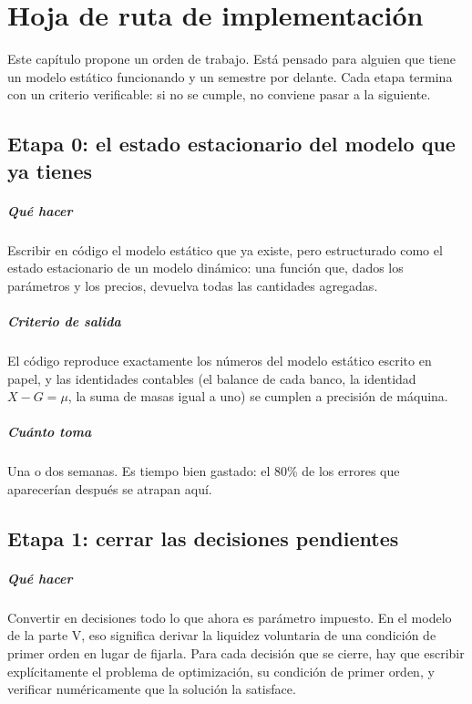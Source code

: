 \chapter{Hoja de ruta de implementación}
\label{cap:hoja-ruta}

Este capítulo propone un orden de trabajo. Está pensado para alguien que tiene un
modelo estático funcionando y un semestre por delante. Cada etapa termina con un
criterio verificable: si no se cumple, no conviene pasar a la siguiente.

\section{Etapa 0: el estado estacionario del modelo que ya tienes}

\paragraph{Qué hacer} Escribir en código el modelo estático que ya existe, pero
estructurado como el estado estacionario de un modelo dinámico: una función que,
dados los parámetros y los precios, devuelva todas las cantidades agregadas.

\paragraph{Criterio de salida} El código reproduce exactamente los números del
modelo estático escrito en papel, y las identidades contables (el balance de cada
banco, la identidad $X-G=\mu$, la suma de masas igual a uno) se cumplen a
precisión de máquina.

\paragraph{Cuánto toma} Una o dos semanas. Es tiempo bien gastado: el 80\% de los
errores que aparecerían después se atrapan aquí.

\section{Etapa 1: cerrar las decisiones pendientes}

\paragraph{Qué hacer} Convertir en decisiones todo lo que ahora es parámetro
impuesto. En el modelo de la parte V, eso significa derivar la liquidez
voluntaria de una condición de primer orden en lugar de fijarla. Para cada
decisión que se cierre, hay que escribir explícitamente el problema de
optimización, su condición de primer orden, y verificar numéricamente que la
solución la satisface.

